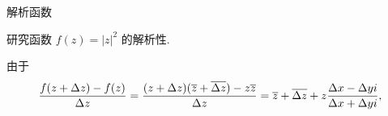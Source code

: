 \begin{frame}{解析函数}
	\onslide<+->
	\begin{example}
		研究函数 $f(z)=|z|^2$ 的解析性.
	\end{example}

	\onslide<+->
	\begin{solution*}
		由于
		\[
			\frac{f(z+\Delta z)-f(z)}{\Delta z}
			=\frac{(z+\Delta z)(\overline z+\overline{\Delta z})-z\overline z}{\Delta z}
			=\overline z+\overline{\Delta z}+z\frac{\Delta x-\Delta yi}{\Delta x+\Delta yi},
		\]



	\end{solution*}
\end{frame}

